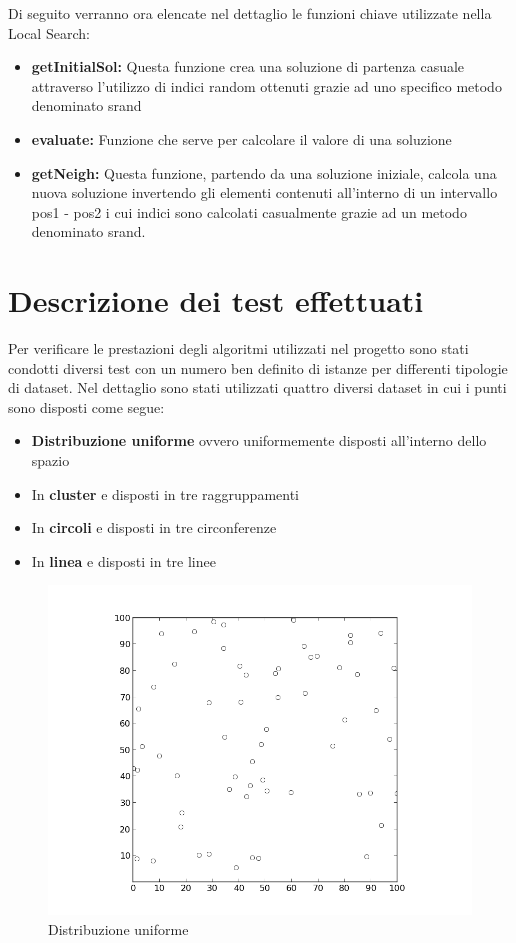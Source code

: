 \documentclass[preprint,12pt]{elsarticle}
\begin{document}
Di seguito verranno ora elencate nel dettaglio le funzioni chiave utilizzate nella Local Search:

\begin{itemize}
\item \textbf{getInitialSol:} Questa funzione crea una soluzione di partenza casuale attraverso l'utilizzo di indici random ottenuti grazie ad uno specifico metodo denominato srand
\item \textbf{evaluate:} Funzione che serve per calcolare il valore di una soluzione 
\item \textbf{getNeigh:} Questa funzione, partendo da una soluzione iniziale, calcola una nuova soluzione invertendo gli elementi contenuti all'interno di un intervallo pos1 - pos2 i cui indici sono calcolati casualmente grazie ad un metodo denominato srand.
\end{itemize}

\section{Descrizione dei test effettuati}
\label{S:3}

Per verificare le prestazioni degli algoritmi utilizzati nel progetto sono stati condotti diversi test con un numero ben definito di istanze per differenti tipologie di dataset. Nel dettaglio sono stati utilizzati quattro diversi dataset in cui i punti sono disposti come segue:

\begin{itemize}
\item \textbf{Distribuzione uniforme} ovvero uniformemente disposti all'interno dello spazio
\item In \textbf{cluster} e disposti in tre raggruppamenti
\item In \textbf{circoli} e disposti in tre circonferenze
\item In \textbf{linea} e disposti in tre linee
\end{itemize}

\begin{figure}[htbp]
\centering
\includegraphics[scale=0.50]{grafici_istanze/random_60.png} 
\caption{Distribuzione uniforme}\label{fig:1}
\end{figure}
\end{document}
